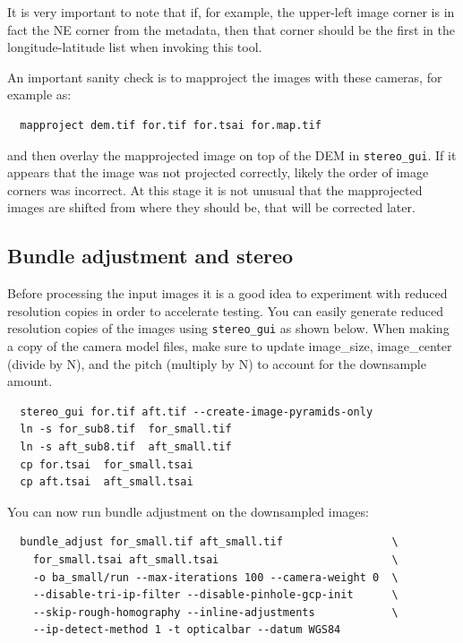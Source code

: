 It is very important to note that if, for example, the upper-left image
corner is in fact the NE corner from the metadata, then that corner 
should be the first in the longitude-latitude list when invoking this tool.

An important sanity check is to mapproject the images with these
cameras, for example as:

\begin{verbatim}
  mapproject dem.tif for.tif for.tsai for.map.tif
\end{verbatim}

and then overlay the mapprojected image on top of the DEM in \texttt{stereo\_gui}.
If it appears that the image was not projected correctly, likely 
the order of image corners was incorrect. At this stage it is not unusual
that the mapprojected images are shifted from where they should be, that
will be corrected later. 

\subsection{Bundle adjustment and stereo}

Before processing the input images it is a good idea to experiment with
reduced resolution copies in order to accelerate testing.  You can easily
generate reduced resolution copies of the images using \texttt{stereo\_gui}
as shown below.  When making a copy of the camera model files, make sure to
update image\_size, image\_center (divide by N), and the pitch (multiply by N)
to account for the downsample amount.

\begin{verbatim}
  stereo_gui for.tif aft.tif --create-image-pyramids-only
  ln -s for_sub8.tif  for_small.tif
  ln -s aft_sub8.tif  aft_small.tif
  cp for.tsai  for_small.tsai
  cp aft.tsai  aft_small.tsai
\end{verbatim}

You can now run bundle adjustment on the downsampled images:

\begin{verbatim}
  bundle_adjust for_small.tif aft_small.tif                 \
    for_small.tsai aft_small.tsai                           \
    -o ba_small/run --max-iterations 100 --camera-weight 0  \
    --disable-tri-ip-filter --disable-pinhole-gcp-init      \
    --skip-rough-homography --inline-adjustments            \
    --ip-detect-method 1 -t opticalbar --datum WGS84
\end{verbatim}

